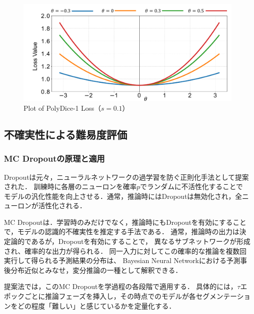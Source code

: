 \documentclass[10pt, a4paper, twocolumn]{jarticle}
\begin{document}
\begin{figure}
  \includegraphics[width=\columnwidth]{figure/loss.pdf}
  \caption{Plot of PolyDice-1 Loss（$s = 0.1$）}
  \label{polydice}
\end{figure}

\subsection{不確実性による難易度評価}

\subsubsection{MC Dropoutの原理と適用}

Dropoutは元々，ニューラルネットワークの過学習を防ぐ正則化手法として提案された\cite{JMLR:v15:srivastava14a}．
訓練時に各層のニューロンを確率$p$でランダムに不活性化することで
モデルの汎化性能を向上させる．通常，推論時にはDropoutは無効化され，全ニューロンが活性化される．

MC Dropoutは．学習時のみだけでなく，推論時にもDropoutを有効にすることで，モデルの認識的不確実性を推定する手法である．
通常，推論時の出力は決定論的であるが，Dropoutを有効にすることで，
異なるサブネットワークが形成され、確率的な出力が得られる．
同一入力に対してこの確率的な推論を複数回実行して得られる予測結果の分布は、
Bayesian Neural Networkにおける予測事後分布近似とみなせ，変分推論の一種として解釈できる．

提案法では，このMC Dropoutを学過程の各段階で適用する．
具体的には，$\tau$エポックごとに推論フェーズを挿入し，その時点でのモデルが各セグメンテーションをどの程度「難しい」と感じているかを定量化する．
\end{document}
